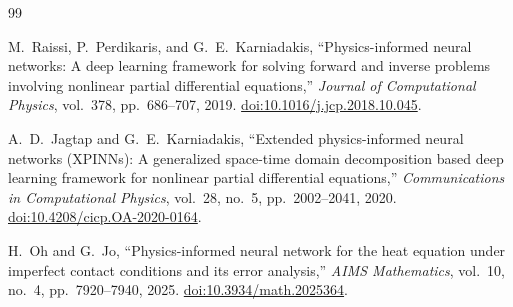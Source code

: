 \documentclass[11pt,a4paper]{article}
\begin{document}
\begin{thebibliography}{99}

M.~Raissi, P.~Perdikaris, and G.~E.~Karniadakis,
``Physics-informed neural networks: A deep learning framework
for solving forward and inverse problems involving nonlinear
partial differential equations,''
\emph{Journal of Computational Physics},
vol.~378, pp.~686--707, 2019.
\href{https://doi.org/10.1016/j.jcp.2018.10.045}
{doi:10.1016/j.jcp.2018.10.045}.

A.~D.~Jagtap and G.~E.~Karniadakis,
``Extended physics-informed neural networks (XPINNs):
A generalized space-time domain decomposition based deep
learning framework for nonlinear partial differential
equations,''
\emph{Communications in Computational Physics},
vol.~28, no.~5, pp.~2002--2041, 2020.
\href{https://doi.org/10.4208/cicp.OA-2020-0164}
{doi:10.4208/cicp.OA-2020-0164}.

H.~Oh and G.~Jo,
``Physics-informed neural network for the heat equation
under imperfect contact conditions and its error analysis,''
\emph{AIMS Mathematics},
vol.~10, no.~4, pp.~7920--7940, 2025.
\href{https://doi.org/10.3934/math.2025364}
{doi:10.3934/math.2025364}.

\end{thebibliography}
\end{document}
